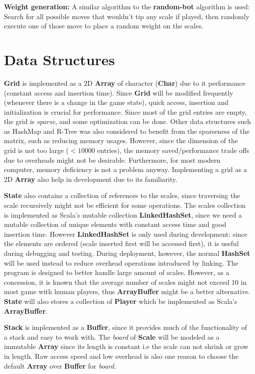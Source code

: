 \documentclass[12pt]{article}
\begin{document}
\textbf{Weight generation:} 
A similar algorithm to the \textbf{random-bot} algorithm is used: Search for
all possible moves that wouldn't tip any scale if played, then randomly execute
one of those move to place a random weight on the scales.

\section{Data Structures}

\textbf{Grid} is implemented as a 2D \textbf{Array} of character (\textbf{Char})
due to it performance (constant access and insertion time). Since \textbf{Grid}
will be modified frequently (whenever there is a change in the game state),
quick access, insertion and initialization is crucial for performance. Since
most of the grid entries are empty, the grid is \textit{sparse}, and some
optimization can be done. Other data structures such as HashMap and R-Tree was
also considered to benefit from the sparseness of the matrix, such as reducing
memory usages. However, since the dimension of the grid is not too large ($<
10000$ entries), the memory saved/performance trade offs due to overheads might
not be desirable. Furthermore, for most modern computer, memory deficiency is
not a problem anyway. Implementing a grid as a 2D \textbf{Array} also help in
development due to its familiarity.

\textbf{State} also contains a collection of references to the scales, since
traversing the scale recursively might not be efficient for some operations. The
scales collection is implemented as Scala's mutable collection
\textbf{LinkedHashSet}, since we need a mutable collection of unique elements
with constant access time and good insertion time. However
\textbf{LinkedHashSet} is only used during development: since the elements are
ordered (scale inserted first will be accessed first), it is useful during
debugging and testing. During deployment, however, the normal \textbf{HashSet}
will be used instead to reduce overhead operations introduced by linking. The
program is designed to better handle large amount of scales.  However, as a
concession, it is known that the average number of scales might not exceed $10$
in most game with human players, thus \textbf{ArrayBuffer} might be a better
alternative. \textbf{State} will also stores a collection of \textbf{Player}
which be implemented as Scala's \textbf{ArrayBuffer}.

\textbf{Stack} is implemented as a \textbf{Buffer}, since it provides much of
the functionality of a stack and easy to work with.  The \textit{board} of
\textbf{Scale} will be modeled as a immutable \textbf{Array} since its length is
constant i.e the scale can not shrink or grow in length. Raw access speed and
low overhead is also one reason to choose the default \textbf{Array} over
\textbf{Buffer} for \textit{board}.
\end{document}
